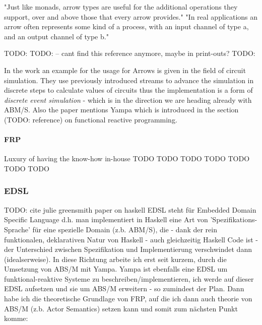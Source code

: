 "Just like monads, arrow types are useful for the additional operations they support, over and above those that every arrow provides."
"In real applications an arrow often represents some kind of a process, with an input channel of type a, and an output channel of type b."

TODO: \cite{hughes_generalising_2000}
TODO: \cite{Hughes2004} -- cant find this reference anymore, maybe in print-outs?
TODO: \cite{hughes_programming_2005}

In the work \cite{Hughes2004} an example for the usage for Arrows is given in the field of circuit simulation. They use previously introduced streams to advance the simulation in discrete steps to calculate values of circuits thus the implementation is a form of \textit{discrete event simulation} - which is in the direction we are heading already with ABM/S. Also the paper mentions Yampa which is introduced in the section (TODO: reference) on functional reactive programming.

\paragraph{FRP}
Luxury of having the know-how in-house
TODO \cite{courtney_yampa_2003}
TODO \cite{nilsson_functional_2002}
TODO \cite{hudak_arrows_2003}
TODO \cite{mun_hon_functional_2005}
TODO \cite{meisinger_game-engine-architektur_2010}
TODO \cite{nilsson_declarative_2014}
TODO \cite{perez_functional_2016}

\subsubsection{EDSL}
TODO: cite julie greensmith paper on haskell
EDSL steht für Embedded Domain Specific Language d.h. man implementiert in Haskell eine Art von 'Spezifikations-Sprache' für eine spezielle Domain (z.b. ABM/S), die - dank der rein funktionalen, deklarativen Natur von Haskell - auch gleichzeitig Haskell Code ist - der Unterschied zwischen Spezifikation und Implementierung verschwindet dann (idealserweise). In diese Richtung arbeite ich erst seit kurzem, durch die Umsetzung von ABS/M mit Yampa. Yampa ist ebenfalls eine EDSL um funktional-reaktive Systeme zu beschreiben/implementieren, ich werde auf dieser EDSL aufsetzen und sie um ABS/M erweitern - so zumindest der Plan. Dann habe ich die theoretische Grundlage von FRP, auf die ich dann auch theorie von ABS/M (z.b. Actor Semantics) setzen kann und somit zum nächsten Punkt komme:

